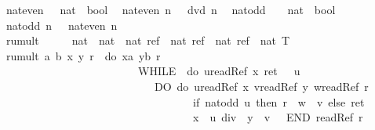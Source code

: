 \begin{isabellebody}
\begin{isamarkuptext}
  \label{isa:rumult-spec}%
\end{isamarkuptext}%
\isamarkuptrue%
\isanewline
\ \ nat{\isacharunderscore}even\ \ {\isacharcolon}{\isacharcolon}\ {\isachardoublequote}nat\ {\isasymRightarrow}\ bool{\isachardoublequote}\isanewline
\ \ {\isachardoublequote}nat{\isacharunderscore}even\ n\ {\isasymequiv}\ {}\ dvd\ n{\isachardoublequote}\isanewline
\ \ nat{\isacharunderscore}odd\ \ \ {\isacharcolon}{\isacharcolon}\ {\isachardoublequote}nat\ {\isasymRightarrow}\ bool{\isachardoublequote}\isanewline
\ \ {\isachardoublequote}nat{\isacharunderscore}odd\ n\ {\isasymequiv}\ {\isasymnot}\ nat{\isacharunderscore}even\ n{\isachardoublequote}\isanewline
\ \ rumult\ \ \ \ \ {\isacharcolon}{\isacharcolon}\ {\isachardoublequote}nat\ {\isasymRightarrow}\ nat\ {\isasymRightarrow}\ nat\ ref\ {\isasymRightarrow}\ nat\ ref\ {\isasymRightarrow}\ nat\ ref\ {\isasymRightarrow}\ nat\ T{\isachardoublequote}\isanewline
\ \ {\isachardoublequote}rumult\ a\ b\ x\ y\ r\ {\isasymequiv}\ do\ {\isacharbraceleft}x{\isacharcolon}{\isacharequal}a{\isacharsemicolon}\ y{\isacharcolon}{\isacharequal}b{\isacharsemicolon}\ r{\isacharcolon}{\isacharequal}{}{\isacharsemicolon}\isanewline
\ \ \ \ \ \ \ \ \ \ \ \ \ \ \ \ \ \ \ \ \ \ \ \ \ \ WHILE\ {\isacharparenleft}{\isasymUp}\ {\isacharparenleft}do\ {\isacharbraceleft}u{\isasymleftarrow}readRef\ x{\isacharsemicolon}\ ret\ {\isacharparenleft}{}\ {\isacharless}\ u{\isacharparenright}{\isacharbraceright}{\isacharparenright}{\isacharparenright}\isanewline
\ \ \ \ \ \ \ \ \ \ \ \ \ \ \ \ \ \ \ \ \ \ \ \ \ \ \ \ \ DO\ do\ {\isacharbraceleft}u{\isasymleftarrow}readRef\ x{\isacharsemicolon}\ v{\isasymleftarrow}readRef\ y{\isacharsemicolon}\ w{\isasymleftarrow}readRef\ r{\isacharsemicolon}\isanewline
\ \ \ \ \ \ \ \ \ \ \ \ \ \ \ \ \ \ \ \ \ \ \ \ \ \ \ \ \ \ \ \ \ \ \ \ if\ {\isacharparenleft}nat{\isacharunderscore}odd\ u{\isacharparenright}\ then\ {\isacharparenleft}r\ {\isacharcolon}{\isacharequal}\ w\ {\isacharplus}\ v{\isacharparenright}\ else\ ret\ {\isacharparenleft}{\isacharparenright}{\isacharsemicolon}\isanewline
\ \ \ \ \ \ \ \ \ \ \ \ \ \ \ \ \ \ \ \ \ \ \ \ \ \ \ \ \ \ \ \ \ \ \ \ x\ {\isacharcolon}{\isacharequal}\ u\ div\ {}{\isacharsemicolon}\ y\ {\isacharcolon}{\isacharequal}\ v\ {\isacharasterisk}\ {}{\isacharbraceright}\ END{\isacharsemicolon}\ readRef\ r{\isacharbraceright}{\isachardoublequote}\isamarkupfalse%
%
\isamarkuptrue%
%
\begin{isamarkuptext}%

\end{isamarkuptext}
\end{isabellebody}
